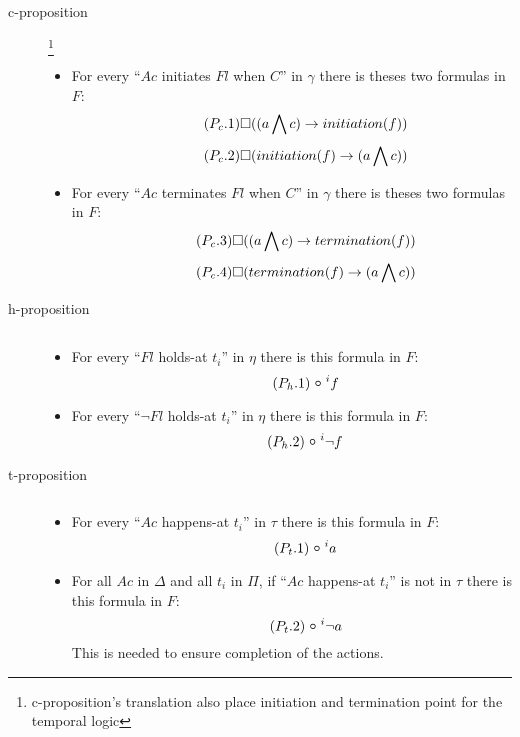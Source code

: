 \begin{description}
  \item[c-proposition]\footnote{c-proposition's translation also place initiation and termination point for the temporal logic}
  \begin{itemize}
    \item For every “$Ac$ initiates $Fl$ when $C$” in $\gamma$ there is theses two formulas in $F$:
    \begin{equation}\tag{$P_c.1$}
      \square((a\bigwedge c)\rightarrow initiation(f))
    \end{equation}
    \begin{equation}\tag{$P_c.2$}
      \square(initiation(f)\rightarrow (a\bigwedge c))
    \end{equation}
    \item For every “$Ac$ terminates $Fl$ when $C$” in $\gamma$ there is theses two formulas in $F$:
    \begin{equation}\tag{$P_c.3$}
      \square((a\bigwedge c)\rightarrow termination(f))
    \end{equation}
    \begin{equation}\tag{$P_c.4$}
      \square(termination(f)\rightarrow (a\bigwedge c))
    \end{equation}
  \end{itemize}
  \item[h-proposition] $ $
  \begin{itemize}
    \item For every “$Fl$ holds-at $t_i$” in $\eta$ there is this formula in $F$:
    \begin{equation}\tag{$P_h.1$}
      \next^{i}f
    \end{equation}
    \item For every “$\neg Fl$ holds-at $t_i$” in $\eta$ there is this formula in $F$:
    \begin{equation}\tag{$P_h.2$}
      \next^{i} \neg f
    \end{equation}
  \end{itemize}
  \item[t-proposition] $ $
  \begin{itemize}
    \item For every “$Ac$ happens-at $t_i$” in $\tau$ there is this formula in $F$:
    \begin{equation}\tag{$P_t.1$}
      \next^{i}a
    \end{equation}
    \item For all $Ac$ in $\Delta$ and all $t_i$ in $\Pi$, if “$Ac$ happens-at $t_i$” is not in $\tau$ there is this formula in $F$:
    \begin{equation}\tag{$P_t.2$}
      \next^{i}\neg a
    \end{equation}
      This is needed to ensure completion of the actions.

  \end{itemize}
\end{description}

